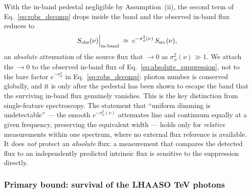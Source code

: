 \documentclass[aps,prd,onecolumn,amsmath,amssymb]{revtex4-2}
\begin{document}
With the in-band pedestal negligible by Assumption~(ii), the second term
of Eq.~\eqref{eq:robs_decomp} drops inside the band and the observed
in-band flux reduces to
\begin{equation}
  S_{\rm obs}(\nu)\Big|_{\rm in\text{-}band}
    \;\approx\; e^{-\sigma_\phi^2(\nu)}\,S_{\rm src}(\nu),
  \label{eq:absolute_suppression}
\end{equation}
an \emph{absolute} attenuation of the source flux that
$\to0$ as $\sigma_\phi^2(\nu)\gg1$.  We attach the $\to0$ to the observed
in-band flux of Eq.~\eqref{eq:absolute_suppression}, not to the bare
factor $e^{-\sigma_\phi^2}$ in Eq.~\eqref{eq:robs_decomp}: photon number
is conserved globally, and it is only after the pedestal has been shown
to escape the band that the surviving in-band flux genuinely vanishes.
This is the key distinction from single-feature spectroscopy.  The
statement that ``uniform dimming is undetectable'' --- the smooth
$e^{-\sigma_\phi^2(\nu)}$ attenuates line and continuum equally at a
given frequency, preserving the equivalent width --- holds only for
\emph{relative} measurements within one spectrum, where no external flux
reference is available.  It does \emph{not} protect an \emph{absolute}
flux: a measurement that compares the detected flux to an
independently predicted intrinsic flux is sensitive to the suppression
directly.

\subsubsection{Primary bound: survival of the LHAASO TeV photons}
\label{sec:grb_tev}
\end{document}
